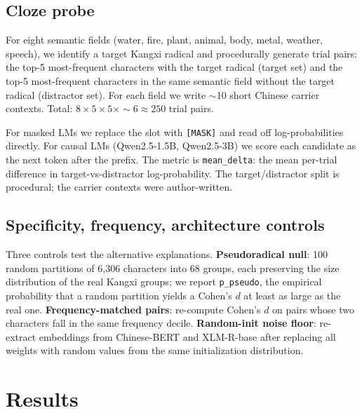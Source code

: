 \documentclass[11pt,a4paper,twocolumn]{article}
\begin{document}
\subsection{Cloze probe}
For eight semantic fields (water, fire, plant, animal, body, metal,
weather, speech), we identify a target Kangxi radical and procedurally
generate trial pairs: the top-5 most-frequent characters with the
target radical (target set) and the top-5 most-frequent characters in
the same semantic field without the target radical (distractor set).
For each field we write $\sim$10 short Chinese carrier contexts. Total:
$8 \times 5 \times 5 \times \sim 6 \approx 250$ trial pairs.

For masked LMs we replace the slot with \texttt{[MASK]} and read off
log-probabilities directly. For causal LMs (Qwen2.5-1.5B, Qwen2.5-3B)
we score each candidate as the next token after the prefix. The metric
is \texttt{mean\_delta}: the mean per-trial difference in
target-vs-distractor log-probability. The target/distractor split is
procedural; the carrier contexts were author-written.

\subsection{Specificity, frequency, architecture controls}
Three controls test the alternative explanations.
\textbf{Pseudoradical null}: 100 random partitions of 6{,}306
characters into 68 groups, each preserving the size distribution of
the real Kangxi groups; we report \texttt{p\_pseudo}, the empirical
probability that a random partition yields a Cohen's $d$ at least as
large as the real one. \textbf{Frequency-matched pairs}: re-compute
Cohen's $d$ on pairs whose two characters fall in the same frequency
decile. \textbf{Random-init noise floor}: re-extract embeddings from
Chinese-BERT and XLM-R-base after replacing all weights with random
values from the same initialization distribution.

\section{Results}
\label{sec:results}
\end{document}

